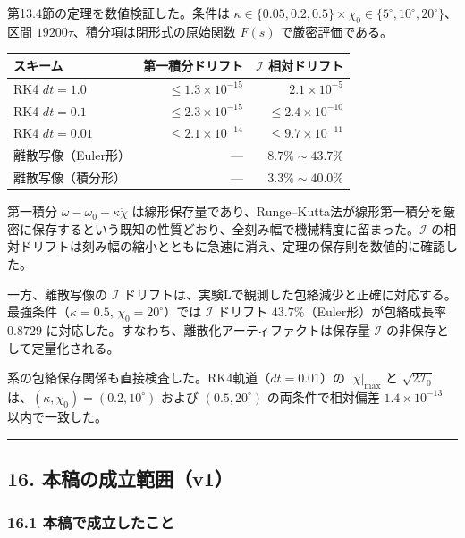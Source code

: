 \documentclass[
  a4paper,
]{ltjsarticle}
\newcounter{none} %
\begin{document}
第13.4節の定理を数値検証した。条件は
\(\kappa\in\{0.05,0.2,0.5\}\times\chi_0\in\{5^\circ,10^\circ,20^\circ\}\)、区間
\(19200\tau\)、積分項は閉形式の原始関数 \(F(s)\) で厳密評価である。

{\def\LTcaptype{none} %
\begin{longtable}[]{@{}lrr@{}}
\toprule\noalign{}
スキーム & 第一積分ドリフト & \(\mathcal I\) 相対ドリフト \\
\midrule\noalign{}
\endhead
\bottomrule\noalign{}
\endlastfoot
RK4 \(dt=1.0\) & \(\le1.3\times10^{-15}\) & \(2.1\times10^{-5}\) \\
RK4 \(dt=0.1\) & \(\le2.3\times10^{-15}\) & \(\le2.4\times10^{-10}\) \\
RK4 \(dt=0.01\) & \(\le2.1\times10^{-14}\) & \(\le9.7\times10^{-11}\) \\
離散写像（Euler形） & --- & \(8.7\%\sim43.7\%\) \\
離散写像（積分形） & --- & \(3.3\%\sim40.0\%\) \\
\end{longtable}
}

第一積分 \(\omega-\omega_0-\kappa\dot\chi\)
は線形保存量であり、Runge--Kutta法が線形第一積分を厳密に保存するという既知の性質どおり、全刻み幅で機械精度に留まった。\(\mathcal I\)
の相対ドリフトは刻み幅の縮小とともに急速に消え、定理の保存則を数値的に確認した。

一方、離散写像の \(\mathcal I\)
ドリフトは、実験Lで観測した包絡減少と正確に対応する。最強条件（\(\kappa=0.5\),
\(\chi_0=20^\circ\)）では \(\mathcal I\) ドリフト
\(43.7\%\)（Euler形）が包絡成長率 \(0.8729\)
に対応した。すなわち、離散化アーティファクトは保存量 \(\mathcal I\)
の非保存として定量化される。

系の包絡保存関係も直接検査した。RK4軌道（\(dt=0.01\)）の
\(\lvert\chi\rvert_{\max}\) と \(\sqrt{2\mathcal I_0}\)
は、\((\kappa,\chi_0)=(0.2,10^\circ)\) および \((0.5,20^\circ)\)
の両条件で相対偏差 \(1.4\times10^{-13}\) 以内で一致した。

\begin{center}\rule{0.5\linewidth}{0.5pt}\end{center}

\subsection{16.
本稿の成立範囲（v1）}\label{ux672cux7a3fux306eux6210ux7acbux7bc4ux56f2v1}

\subsubsection{16.1
本稿で成立したこと}\label{ux672cux7a3fux3067ux6210ux7acbux3057ux305fux3053ux3068}
\end{document}
